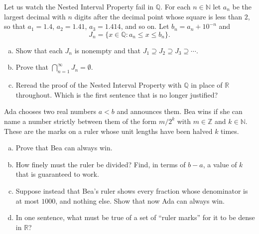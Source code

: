 \begin{problem}
Let us watch the Nested Interval Property fail in $\mathbb{Q}$.  For each $n \in \mathbb{N}$ let $a_n$ be the largest decimal with $n$ digits after the decimal point whose square is less than $2$, so that $a_1 = 1.4$, $a_2 = 1.41$, $a_3 = 1.414$, and so on.  Let $b_n = a_n + 10^{-n}$ and
\[ J_n = \{ x \in \mathbb{Q} : a_n \leq x \leq b_n \}. \]
\begin{enumerate}[(a)]
	\item Show that each $J_n$ is nonempty and that $J_1 \supseteq J_2 \supseteq J_3 \supseteq \cdots$.
	\item Prove that $\bigcap_{n=1}^{\infty} J_n = \emptyset$.
	\item Reread the proof of the Nested Interval Property with $\mathbb{Q}$ in place of $\mathbb{R}$ throughout.  Which is the first sentence that is no longer justified?
\end{enumerate}
\end{problem}

\begin{problem}
Ada chooses two real numbers $a < b$ and announces them.  Bea wins if she can name a number strictly between them of the form $m/2^k$ with $m \in \mathbb{Z}$ and $k \in \mathbb{N}$.  These are the marks on a ruler whose unit lengths have been halved $k$ times.
\begin{enumerate}[(a)]
	\item Prove that Bea can always win.
	\item How finely must the ruler be divided?  Find, in terms of $b - a$, a value of $k$ that is guaranteed to work.
	\item Suppose instead that Bea's ruler shows every fraction whose denominator is at most $1000$, and nothing else.  Show that now Ada can always win.
	\item In one sentence, what must be true of a set of ``ruler marks'' for it to be dense in $\mathbb{R}$?
\end{enumerate}
\end{problem}

